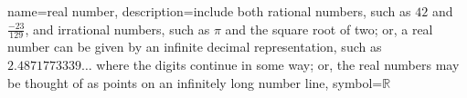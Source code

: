 







{
  name={real number},
  description={include both rational numbers, such as $42$ and 
               $\frac{-23}{129}$, and irrational numbers, 
               such as $\pi$ and the square root of two; or,
               a real number can be given by an infinite decimal
               representation, such as $2.4871773339\ldots$ where
               the digits continue in some way; or, the real
               numbers may be thought of as points on an infinitely
               long number line},
  symbol={\ensuremath{\mathbb{R}}}
}
